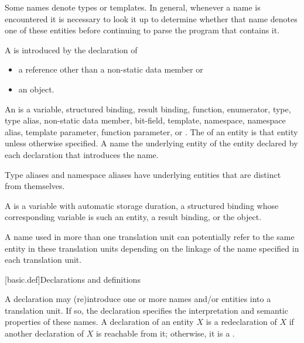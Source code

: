 \pnum
\begin{note}
Some names denote types or templates.
In general, whenever a name is encountered
it is necessary to look it up
to determine whether that name denotes one of these entities
before continuing to parse the program that contains it.
\end{note}

\pnum
A  is introduced by the
declaration of
\begin{itemize}
\item
a reference other than a non-static data member or
\item
an object.
\end{itemize}

\pnum
An  is a
variable,
structured binding,
result binding,
function,
enumerator,
type,
type alias,
non-static data member,
bit-field,
template,
namespace,
namespace alias,
template parameter,
function parameter, or
.
The  of an entity is that entity
unless otherwise specified.
A name  the underlying entity of
the entity declared by each declaration that introduces the name.
\begin{note}
Type aliases and namespace aliases have underlying entities
that are distinct from themselves.
\end{note}

\pnum
A  is a variable with
automatic storage duration,
a structured binding
whose corresponding variable is such an entity,
a result binding,
or the  object.

\pnum
{}%
%
A name used in more than one translation unit can potentially
refer to the same entity in these translation units depending on the
linkage of the name specified in each
translation unit.

[basic.def]{Declarations and definitions}

\pnum
{}%
%
%
A declaration may (re)introduce
one or more names and/or entities into a translation
unit.
If so, the
declaration specifies the interpretation and semantic properties of these names.
A declaration of an entity $X$ is
a redeclaration of $X$
if another declaration of $X$ is reachable from it;
otherwise, it is a .

